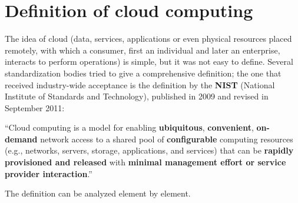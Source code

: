 \section{Definition of cloud computing}

The idea of cloud (data, services, applications or even physical resources placed remotely, with which a consumer, first an individual and later an enterprise, interacts to perform operations) is simple, but it was not easy to define. Several standardization bodies tried to give a comprehensive definition; the one that received industry-wide acceptance is the definition by the \textbf{NIST} (National Institute of Standards and Technology), published in 2009 and revised in September 2011:

\begin{notebox}
	``Cloud computing is a model for enabling \textbf{ubiquitous}, \textbf{convenient}, \textbf{on-demand} network access to a shared pool of \textbf{configurable} computing resources (e.g., networks, servers, storage, applications, and services) that can be \textbf{rapidly provisioned and released} with \textbf{minimal management effort or service provider interaction}.''
\end{notebox}

The definition can be analyzed element by element.

